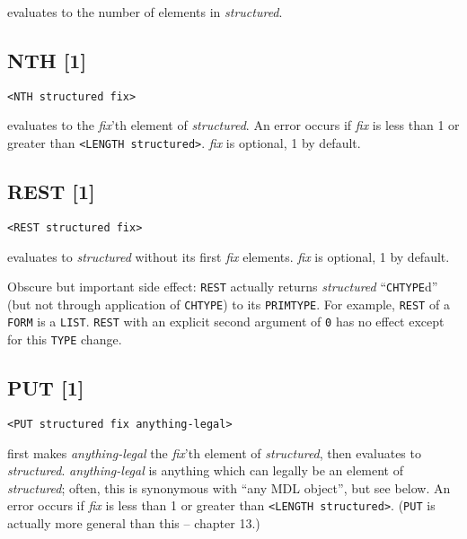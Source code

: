 \documentclass[a4paper]{scrbook}
\begin{document}
 evaluates to the number of elements in \emph{structured}.

\subsection{NTH {[}1{]}}\label{nth-1}

\begin{verbatim}
<NTH structured fix>
\end{verbatim}

 evaluates to the \emph{fix}'th element of \emph{structured}. An error occurs if \emph{fix} is
less than 1 or greater than \texttt{\textless{}LENGTH\ structured\textgreater{}}. \emph{fix} is optional, 1 by default.

\subsection{REST {[}1{]}}\label{rest-1}

\begin{verbatim}
<REST structured fix>
\end{verbatim}

 evaluates to \emph{structured} without its first \emph{fix} elements. \emph{fix} is optional,
1 by default.

Obscure but important side effect: \texttt{REST} actually returns \emph{structured} ``\texttt{CHTYPE}d'' (but not through
application of \texttt{CHTYPE}) to its \texttt{PRIMTYPE}. For example, \texttt{REST} of a \texttt{FORM} is a \texttt{LIST}.
\texttt{REST} with an explicit second argument of \texttt{0} has no effect except for this \texttt{TYPE} change.

\subsection{PUT {[}1{]}}\label{put-1}

\begin{verbatim}
<PUT structured fix anything-legal>
\end{verbatim}

 first makes \emph{anything-legal} the \emph{fix}'th element of \emph{structured}, then
evaluates to \emph{structured}. \emph{anything-legal} is anything which can legally be an element of \emph{structured};
often, this is synonymous with ``any MDL object'', but see below. An error occurs if \emph{fix} is less than 1 or greater
than \texttt{\textless{}LENGTH\ structured\textgreater{}}. (\texttt{PUT} is actually more general than this -- chapter 13.)
\end{document}
